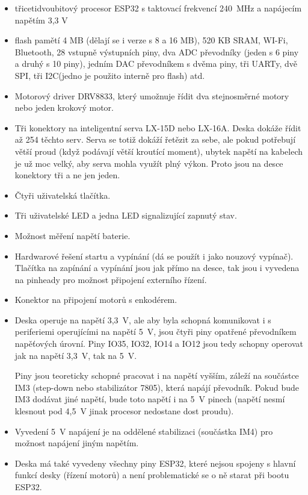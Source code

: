 \documentclass{template/socthesis}
\begin{document}
\begin{itemize}
	\item třicetidvoubitový procesor ESP32 s taktovací frekvencí 240~MHz a napájecím napětím 3,3 V 
	\item flash pamětí 4 MB (dělají se i verze s 8 a 16 MB), 520 KB SRAM, WI-Fi, Bluetooth, 28 vstupně výstupních piny, dva ADC převodníky (jeden s 6 piny a druhý s 10 piny), jedním DAC převodníkem s dvěma piny, tři UARTy, dvě SPI, tři I2C(jedno je použito interně pro flash) atd.
	
	\item Motorový driver DRV8833, který umožnuje řídit dva stejnosměrné motory nebo jeden krokový motor.
	
	\item Tři konektory na inteligentní serva LX-15D nebo LX-16A. Deska dokáže řídit až 254 těchto serv. Serva se totiž dokáží řetězit za sebe, ale pokud potřebují větší proud (když podávají větší kroutící moment), ubytek napětí na kabelech je už moc velký, aby serva mohla využít plný výkon. Proto jsou na desce konektory tři a ne jen jeden.
	
	\item Čtyři uživatelská tlačítka.
	
	\item Tři uživatelské LED a jedna LED signalizující zapnutý stav.
	
	\item Možnost měření napětí baterie.
	
	\item Hardwarové řešení startu a vypínání (dá se použít i jako nouzový vypínač). Tlačítka na zapínání a vypínání jsou jak přímo na desce, tak jsou i vyvedena na pinheady pro možnost připojení externího řízení.
	
	\item Konektor na připojení motorů s enkodérem.
	
	\item Deska operuje na napětí 3,3~V, ale aby byla schopná komunikovat i s periferiemi operujícími
	na napětí 5~V, jsou čtyři piny opatřené převodníkem napěťových úrovní.
	Piny IO35, IO32, IO14 a IO12 jsou tedy schopny operovat jak na napětí 3,3~V, tak na 5~V.
	
	Piny jsou teoreticky schopné pracovat i na napětí vyšším, záleží na součástce IM3
	(step-down nebo stabilizátor 7805), která napájí převodník. Pokud bude IM3 dodávat jiné napětí, bude toto napětí i na 5~V pinech (napětí nesmí klesnout pod 4,5~V jinak procesor nedostane dost proudu).
	
	\item Vyvedení 5~V napájení je na oddělené stabilizaci (součástka IM4) pro možnost napájení jiným napětím.
	
	\item Deska má také vyvedeny všechny piny ESP32, které nejsou spojeny 
	s hlavní funkcí desky (řízení motorů) a není problematické se o ně starat při bootu ESP32.
	
	\end{itemize}
\end{document}
